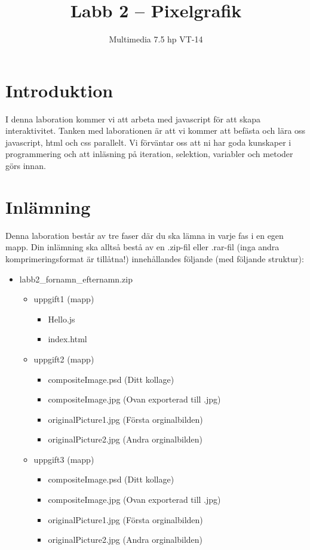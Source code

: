 \documentclass[12pt]{article}
\date{}
\title{ Labb 2 -- Pixelgrafik }
\author{ Multimedia 7.5 hp VT-14 }
\begin{document}
\maketitle
\vspace{-2em}



\section{Introduktion}
I denna laboration kommer vi att arbeta med javascript för att skapa interaktivitet. Tanken med laborationen är att vi kommer att befästa och lära oss javascript, html och css parallelt. Vi förväntar oss att ni har goda kunskaper i programmering och att inläsning på iteration, selektion, variabler och metoder görs innan. 

\section{Inlämning}
Denna laboration består av tre faser där du ska lämna in varje fas i en egen mapp. Din inlämning ska alltså bestå av en .zip-fil eller .rar-fil (inga andra komprimeringsformat är tillåtna!) innehållandes följande (med följande struktur):
  \begin{itemize}
    \item labb2\_fornamn\_efternamn.zip

      \begin{itemize}
        \item uppgift1 (mapp)
          \begin{itemize}
            \item Hello.js 
            \item index.html
      
          \end{itemize}

        \item uppgift2 (mapp)
          \begin{itemize}
	    \item compositeImage.psd (Ditt kollage)
            \item compositeImage.jpg (Ovan exporterad till .jpg)
            \item originalPicture1.jpg (Första orginalbilden)
            \item originalPicture2.jpg (Andra orginalbilden)
          \end{itemize}
	\item uppgift3 (mapp)
          \begin{itemize}
	    \item compositeImage.psd (Ditt kollage)
            \item compositeImage.jpg (Ovan exporterad till .jpg)
            \item originalPicture1.jpg (Första orginalbilden)
            \item originalPicture2.jpg (Andra orginalbilden)
          \end{itemize}
    \end{itemize}
  \end{itemize}
\end{document}
